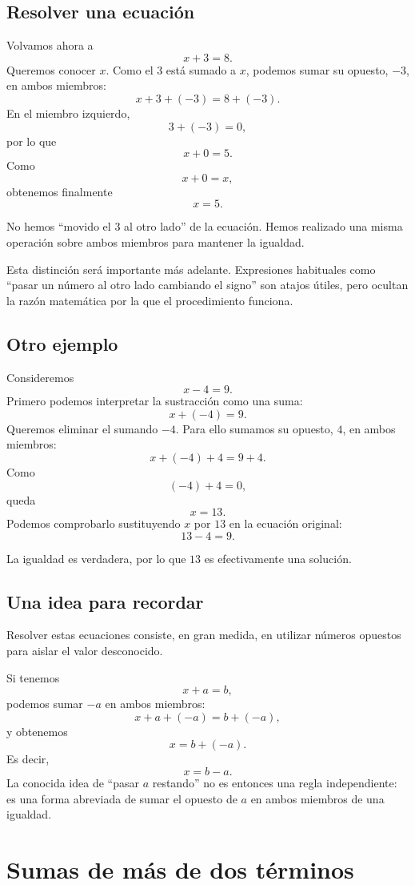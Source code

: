 \subsection{Resolver una ecuación}

Volvamos ahora a
\[
x+3=8.
\]
Queremos conocer \(x\). Como el \(3\) está sumado a \(x\), podemos sumar su opuesto, \(-3\), en ambos miembros:
\[
x+3+(-3)=8+(-3).
\]
En el miembro izquierdo,
\[
3+(-3)=0,
\]
por lo que
\[
x+0=5.
\]
Como
\[
x+0=x,
\]
obtenemos finalmente
\[
x=5.
\]

No hemos ``movido el \(3\) al otro lado'' de la ecuación. Hemos realizado una misma operación sobre ambos miembros para mantener la igualdad.

Esta distinción será importante más adelante. Expresiones habituales como ``pasar un número al otro lado cambiando el signo'' son atajos útiles, pero ocultan la razón matemática por la que el procedimiento funciona.

\subsection{Otro ejemplo}

Consideremos
\[
x-4=9.
\]
Primero podemos interpretar la sustracción como una suma:
\[
x+(-4)=9.
\]
Queremos eliminar el sumando \(-4\). Para ello sumamos su opuesto, \(4\), en ambos miembros:
\[
x+(-4)+4=9+4.
\]
Como
\[
(-4)+4=0,
\]
queda
\[
x=13.
\]
Podemos comprobarlo sustituyendo \(x\) por \(13\) en la ecuación original:
\[
13-4=9.
\]

La igualdad es verdadera, por lo que \(13\) es efectivamente una solución.

\subsection{Una idea para recordar}

Resolver estas ecuaciones consiste, en gran medida, en utilizar números opuestos para aislar el valor desconocido.

Si tenemos
\[
x+a=b,
\]
podemos sumar \(-a\) en ambos miembros:
\[
x+a+(-a)=b+(-a),
\]
y obtenemos
\[
x=b+(-a).
\]
Es decir,
\[
x=b-a.
\]
La conocida idea de ``pasar \(a\) restando'' no es entonces una regla independiente: es una forma abreviada de sumar el opuesto de \(a\) en ambos miembros de una igualdad.


\section{Sumas de más de dos términos}

